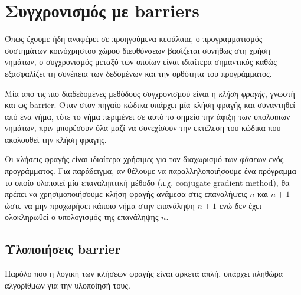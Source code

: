 \chapter{Συγχρονισμός με barriers}
\label{ch:Synchronization with Barriers}
Όπως έχουμε ήδη αναφέρει σε προηγούμενα κεφάλαια, ο προγραμματισμός συστημάτων κοινόχρηστου χώρου διευθύνσεων βασίζεται συνήθως στη χρήση νημάτων, ο συγχρονισμός μεταξύ των οποίων είναι ιδιαίτερα σημαντικός καθώς εξασφαλίζει τη συνέπεια των δεδομένων και την ορθότητα του προγράμματος.

Μία από τις πιο διαδεδομένες μεθόδους συγχρονισμού είναι η \textit{κλήση φραγής}, γνωστή και ως barrier. Όταν στον πηγαίο κώδικα υπάρχει μία κλήση φραγής και συναντηθεί από ένα νήμα, τότε το νήμα περιμένει σε αυτό το σημείο την άφιξη των υπόλοιπων νημάτων, πριν μπορέσουν όλα μαζί να συνεχίσουν την εκτέλεση του κώδικα που ακολουθεί την κλήση φραγής.


Οι κλήσεις φραγής είναι ιδιαίτερα χρήσιμες για τον διαχωρισμό των φάσεων ενός προγράμματος. Για παράδειγμα, αν θέλουμε να παραλληλοποιήσουμε ένα πρόγραμμα το οποίο υλοποιεί μία επαναληπτική μέθοδο (π.χ. conjugate gradient method), θα πρέπει να χρησιμοποιήσουμε κλήση φραγής ανάμεσα στις επαναλήψεις $n$ και $n+1$ ώστε να μην προχωρήσει κάποιο νήμα στην επανάληψη $n+1$ ενώ δεν έχει ολοκληρωθεί ο υπολογισμός της επανάληψης $n$.


\section{Υλοποιήσεις barrier}
\label{sec:Barrier Implementations}
Παρόλο που η λογική των κλήσεων φραγής είναι αρκετά απλή, υπάρχει πληθώρα αλγορίθμων για την υλοποίησή τους.

